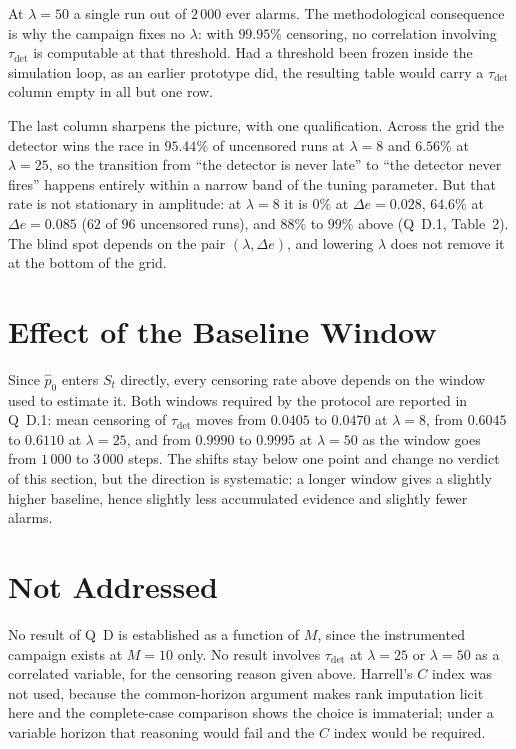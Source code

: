\documentclass[11pt,a4paper]{article}
\begin{document}
At $\lambda = 50$ a single run out of $2\,000$ ever alarms. The methodological consequence
is why the campaign fixes no $\lambda$: with $99.95\%$ censoring, no correlation involving
$\tau_{\mathrm{det}}$ is computable at that threshold. Had a threshold been frozen inside
the simulation loop, as an earlier prototype did, the resulting table would carry a
$\tau_{\mathrm{det}}$ column empty in all but one row.

The last column sharpens the picture, with one qualification. Across the grid the detector
wins the race in $95.44\%$ of uncensored runs at $\lambda = 8$ and $6.56\%$ at
$\lambda = 25$, so the transition from ``the detector is never late'' to ``the detector
never fires'' happens entirely within a narrow band of the tuning parameter. But that rate
is not stationary in amplitude: at $\lambda = 8$ it is $0\%$ at $\Delta e = 0.028$,
$64.6\%$ at $\Delta e = 0.085$ ($62$ of $96$ uncensored runs), and $88\%$ to $99\%$ above
(Q~D.1, Table~2). The blind spot depends on the pair
$(\lambda, \Delta e)$, and lowering $\lambda$ does not remove it at the bottom of the
grid.

\section{Effect of the Baseline Window}

Since $\hat p_0$ enters $S_t$ directly, every censoring rate above depends on the window
used to estimate it. Both windows required by the protocol are reported in Q~D.1: mean
censoring of $\tau_{\mathrm{det}}$ moves from $0.0405$ to $0.0470$ at $\lambda = 8$, from
$0.6045$ to $0.6110$ at $\lambda = 25$, and from $0.9990$ to $0.9995$ at $\lambda = 50$ as
the window goes from $1\,000$ to $3\,000$ steps. The shifts stay below one point and change
no verdict of this section, but the direction is systematic: a longer window gives a
slightly higher baseline, hence slightly less accumulated evidence and slightly fewer
alarms.

\section{Not Addressed}

No result of Q~D is established as a function of $M$, since the instrumented campaign
exists at $M = 10$ only. No result involves $\tau_{\mathrm{det}}$ at $\lambda = 25$ or
$\lambda = 50$ as a correlated variable, for the censoring reason given above. Harrell's
$C$ index was not used, because the common-horizon argument makes rank imputation licit
here and the complete-case comparison shows the choice is immaterial; under a variable
horizon that reasoning would fail and the $C$ index would be required.
\end{document}
